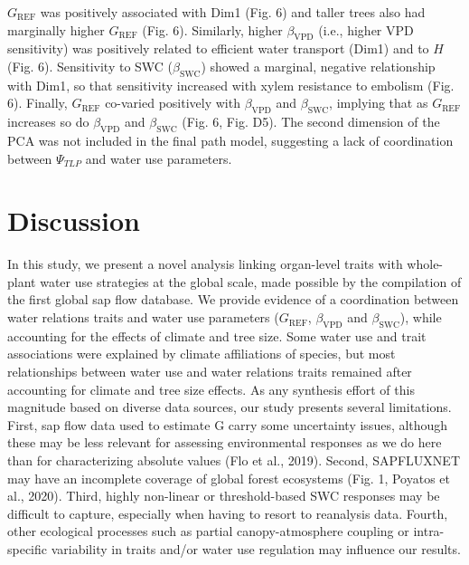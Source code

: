 \documentclass[11pt,twoside]{reedthesis}
\begin{document}
\(G_{\text{REF}}\) was positively associated with Dim1 (Fig. 6) and
taller trees also had marginally higher \(G_{\text{REF}}\) (Fig. 6).
Similarly, higher \(\beta_{\text{VPD}}\) (i.e., higher VPD sensitivity)
was positively related to efficient water transport (Dim1) and to \(H\)
(Fig. 6). Sensitivity to SWC (\(\beta_{\text{SWC}}\)) showed a marginal,
negative relationship with Dim1, so that sensitivity increased with
xylem resistance to embolism (Fig. 6). Finally, \(G_{\text{REF}}\)
co-varied positively with \(\beta_{\text{VPD}}\) and
\(\beta_{\text{SWC}}\), implying that as \(G_{\text{REF}}\) increases so
do \(\beta_{\text{VPD}}\) and \(\beta_{\text{SWC}}\) (Fig. 6, Fig. D5).
The second dimension of the PCA was not included in the final path
model, suggesting a lack of coordination between \(\Psi_{TLP}\) and
water use parameters.\par

\section{Discussion}\label{discussion}

In this study, we present a novel analysis linking organ-level traits
with whole-plant water use strategies at the global scale, made possible
by the compilation of the first global sap flow database. We provide
evidence of a coordination between water relations traits and water use
parameters (\(G_{\text{REF}}\), \(\beta_{\text{VPD}}\) and
\(\beta_{\text{SWC}}\)), while accounting for the effects of climate and
tree size. Some water use and trait associations were explained by
climate affiliations of species, but most relationships between water
use and water relations traits remained after accounting for climate and
tree size effects. As any synthesis effort of this magnitude based on
diverse data sources, our study presents several limitations. First, sap
flow data used to estimate G carry some uncertainty issues, although
these may be less relevant for assessing environmental responses as we
do here than for characterizing absolute values (Flo et al., 2019).
Second, SAPFLUXNET may have an incomplete coverage of global forest
ecosystems (Fig. 1, Poyatos et al., 2020). Third, highly non-linear or
threshold-based SWC responses may be difficult to capture, especially
when having to resort to reanalysis data. Fourth, other ecological
processes such as partial canopy-atmosphere coupling or intra-specific
variability in traits and/or water use regulation may influence our
results.\par
\end{document}
